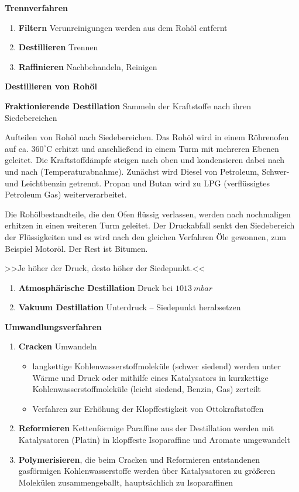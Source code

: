 \textbf{Trennverfahren}

\begin{enumerate}
\item
  \textbf{Filtern} Verunreinigungen werden aus dem Rohöl entfernt
\item
  \textbf{Destillieren} Trennen
\item
  \textbf{Raffinieren} Nachbehandeln, Reinigen
\end{enumerate}

\textbf{Destillieren von Rohöl}

\textbf{Fraktionierende Destillation} Sammeln der Kraftstoffe nach ihren
Siedebereichen

Aufteilen von Rohöl nach Siedebereichen. Das Rohöl wird in einem
Röhrenofen auf ca. $360^\circ\text{C}$ erhitzt und anschließend in
einem Turm mit mehreren Ebenen geleitet. Die Kraftstoffdämpfe steigen
nach oben und kondensieren dabei nach und nach (Temperaturabnahme).
Zunächst wird Diesel von Petroleum, Schwer- und Leichtbenzin getrennt.
Propan und Butan wird zu LPG (verflüssigtes Petroleum Gas)
weiterverarbeitet.

Die Rohölbestandteile, die den Ofen flüssig verlassen, werden nach
nochmaligen erhitzen in einen weiteren Turm geleitet. Der Druckabfall
senkt den Siedebereich der Flüssigkeiten und es wird nach den gleichen
Verfahren Öle gewonnen, zum Beispiel Motoröl. Der Rest ist Bitumen.

>>Je höher der Druck, desto höher der Siedepunkt.<<

\begin{enumerate}
\item
  \textbf{Atmosphärische Destillation} Druck bei $1013~mbar$
\item
  \textbf{Vakuum Destillation} Unterdruck -- Siedepunkt herabsetzen
\end{enumerate}

\textbf{Umwandlungsverfahren}

\begin{enumerate}
\item
  \textbf{Cracken} Umwandeln

  \begin{itemize}
  \item
    langkettige Kohlenwasserstoffmoleküle (schwer siedend) werden unter
    Wärme und Druck oder mithilfe eines Katalysators in kurzkettige
    Kohlenwasserstoffmoleküle (leicht siedend, Benzin, Gas) zerteilt
  \item
    Verfahren zur Erhöhung der Klopffestigkeit von Ottokraftstoffen
  \end{itemize}
\item
  \textbf{Reformieren} Kettenförmige Paraffine aus der Destillation
  werden mit Katalysatoren (Platin) in klopffeste Isoparaffine und
  Aromate umgewandelt
\item
  \textbf{Polymerisieren}, die beim Cracken und Reformieren entstandenen
  gasförmigen Kohlenwasserstoffe werden über Katalysatoren zu größeren
  Molekülen zusammengeballt, hauptsächlich zu Isoparaffinen
\end{enumerate}

